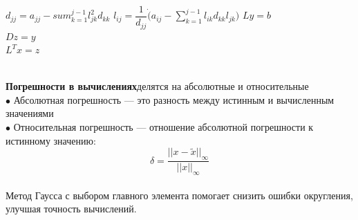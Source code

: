 \documentclass[a4paper, 12pt]{report}
\begin{document}
   \begin{algorithm}
       
        {
       $d_{jj} = a_{jj} - sum_{k = 1}^{j - 1}l_{jk}^2d_{kk}$
        {
       $l_{ij} = \dfrac{1}{d_{jj}} \dot (a_{ij} - \sum_{k = 1}^{j - 1}l_{ik}  d_{kk}  l_{jk})$
       }
       }
       $Ly = b$\\
       $Dz = y$\\
       $L^Tx = z$\\\\
   \end{algorithm}
   \textbf{Погрешности в вычислениях}делятся на абсолютные и относительные\\
   $\bullet$ Абсолютная погрешность — это разность между истинным и вычисленным значениями\\
   $\bullet$ Относительная погрешность — отношение абсолютной погрешности к истинному значению:$$\delta =  \dfrac {||x - \tilde{x}||_{\infty}}{||x||_{\infty}}$$\\
   Метод Гаусса с выбором главного элемента помогает снизить ошибки округления, улучшая точность вычислений.\\
\end{document}
